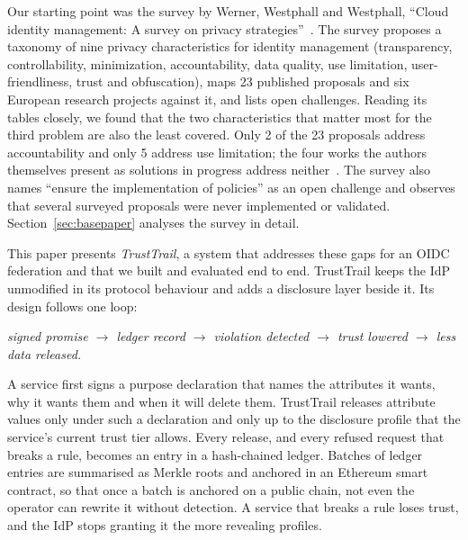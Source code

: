 Our starting point was the survey by Werner, Westphall and Westphall, ``Cloud identity management: A survey on privacy strategies''~\cite{werner2017survey}. The survey proposes a taxonomy of nine privacy characteristics for identity management (transparency, controllability, minimization, accountability, data quality, use limitation, user-friendliness, trust and obfuscation), maps 23 published proposals and six European research projects against it, and lists open challenges. Reading its tables closely, we found that the two characteristics that matter most for the third problem are also the least covered. Only 2 of the 23 proposals address accountability and only 5 address use limitation; the four works the authors themselves present as solutions in progress address neither~\cite[Tables~2--3]{werner2017survey}. The survey also names ``ensure the implementation of policies'' as an open challenge and observes that several surveyed proposals were never implemented or validated. Section~\ref{sec:basepaper} analyses the survey in detail.

This paper presents \emph{TrustTrail}, a system that addresses these gaps for an OIDC federation and that we built and evaluated end to end. TrustTrail keeps the IdP unmodified in its protocol behaviour and adds a disclosure layer beside it. Its design follows one loop:
\begin{center}
\emph{signed promise $\rightarrow$ ledger record $\rightarrow$ violation detected $\rightarrow$ trust lowered $\rightarrow$ less data released.}
\end{center}
A service first signs a purpose declaration that names the attributes it wants, why it wants them and when it will delete them. TrustTrail releases attribute values only under such a declaration and only up to the disclosure profile that the service's current trust tier allows. Every release, and every refused request that breaks a rule, becomes an entry in a hash-chained ledger. Batches of ledger entries are summarised as Merkle roots and anchored in an Ethereum smart contract, so that once a batch is anchored on a public chain, not even the operator can rewrite it without detection. A service that breaks a rule loses trust, and the IdP stops granting it the more revealing profiles.

